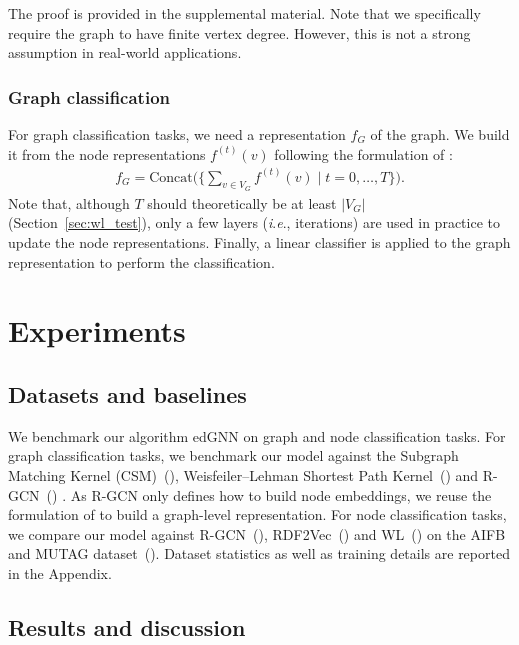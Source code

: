 \documentclass{article} \usepackage{iclr2019_conference,times}
\newcommand{\ie}{\textit{i}.\textit{e}., }
\begin{document}
The proof is provided in the supplemental material. Note that we specifically require the graph to have finite vertex degree. However, this is not a strong assumption in real-world applications.

\subsubsection{Graph classification}

For graph classification tasks, we need a representation $f_G$ of the graph. We build it from the node representations $f^{(t)}(v)$ following the formulation of \cite{Xu2018}:  \begin{align}
    f_G = \mathrm{Concat}\Big( \Big\{\sum_{v \in V_G} f^{(t)}(v) \;\Big|\;t = 0, \dots , T\Big\}\Big).
\end{align}
Note that, although  $T$ should theoretically be at least $|V_G|$ (Section~\ref{sec:wl_test}), only a few layers (\ie iterations) are used in practice to update the node representations. Finally, a linear classifier is  applied to the graph representation to perform the classification.

\section{Experiments}

\subsection{Datasets and baselines}



We benchmark our algorithm edGNN on graph and node classification tasks.
For graph classification tasks, we benchmark our model against the Subgraph Matching Kernel (CSM)~(\cite{Kriege2012}), Weisfeiler--Lehman Shortest Path Kernel~(\cite{Shervashidze2011}) and R-GCN~(\cite{Schlichtkrull2018})
. As R-GCN only defines how to build node embeddings, we reuse the formulation of \cite{Xu2018} to build a graph-level representation. For node classification tasks, we compare our model against R-GCN~(\cite{Schlichtkrull2018}), RDF2Vec~(\cite{Ristoski2016a}) and WL~(\cite{Shervashidze2011, DeVries2015}) on the AIFB and MUTAG dataset~(\cite{Ristoski2016b}). 
Dataset statistics as well as training details are reported in the Appendix.



\subsection{Results and discussion}
\end{document}
